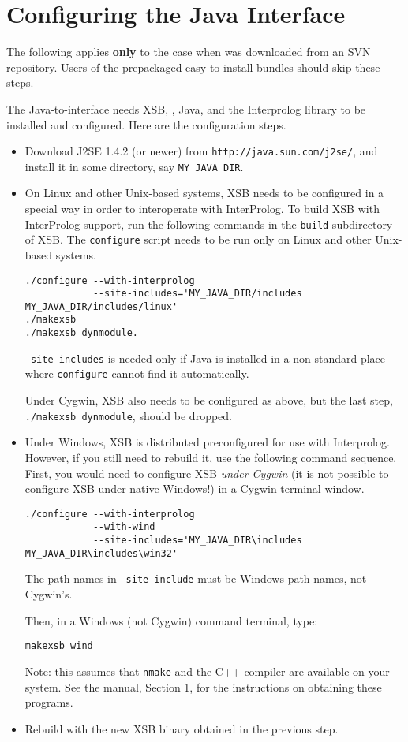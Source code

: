 \section{Configuring the Java Interface}

The following applies \textbf{only} to the case when \FLSYSTEM was
downloaded from an SVN repository. Users of the prepackaged easy-to-install
\FLSYSTEM bundles should skip these steps.

The Java-to-\FLSYSTEM interface needs XSB, \FLSYSTEM, Java, and the
Interprolog library to be installed and configured. Here are the
configuration steps.

\begin{itemize}
\item Download J2SE 1.4.2 (or newer) from
  {\tt http://java.sun.com/j2se/},
and install it in some directory, say {\tt MY\_JAVA\_DIR}.
\item On Linux and other Unix-based systems,
  XSB needs to be configured in a special way
in order to interoperate with InterProlog. To build XSB with
InterProlog support, run the following commands in the {\tt build}
subdirectory of XSB.
The {\tt configure} script needs to be run only on Linux and
other Unix-based systems.
\begin{verbatim}
./configure --with-interprolog
            --site-includes='MY_JAVA_DIR/includes MY_JAVA_DIR/includes/linux'
./makexsb
./makexsb dynmodule.
\end{verbatim}
{\tt --site-includes} is needed only if Java is installed in a non-standard
place where {\tt configure} cannot find it automatically.

Under Cygwin, XSB also needs to be configured as above, but the last step,
{\tt ./makexsb dynmodule}, should be dropped.

\item Under Windows, XSB is distributed preconfigured for use with
  Interprolog. However, if you still need to rebuild it, use the following
  command sequence. First, you would need to configure XSB \emph{under
    Cygwin} (it is not possible to configure XSB under native Windows!) in a
  Cygwin terminal window.  
\begin{verbatim}
./configure --with-interprolog
            --with-wind
            --site-includes='MY_JAVA_DIR\includes MY_JAVA_DIR\includes\win32'
\end{verbatim}
  The path names in {\tt --site-include} must be Windows path names, not
  Cygwin's.

  Then, in a Windows (not Cygwin) command terminal, type:
\begin{verbatim}
makexsb_wind  
\end{verbatim}
  Note: this assumes that {\tt nmake} and the C++ compiler are available on
  your system. See the \FLSYSTEM manual, Section 1, for the instructions on
  obtaining these programs.
\item Rebuild \FLSYSTEM with the new XSB binary obtained in the
previous step.
\end{itemize}

